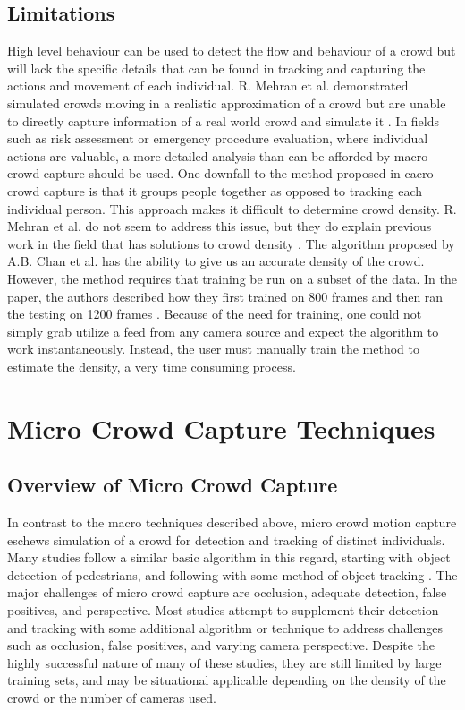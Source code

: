 \documentclass[12pt, twocolumn, conference]{IEEEtran}
\begin{document}
\subsection{Limitations}

High level behaviour can be used to detect the flow and behaviour of a crowd but will lack the specific details that can be found in tracking and capturing the actions and movement of each individual. R. Mehran et al. demonstrated simulated crowds moving in a realistic approximation of a crowd but are unable to directly capture information of a real world crowd and simulate it \cite{R. Mehran}. 
In fields such as risk assessment or emergency procedure evaluation, where individual actions are valuable, a more detailed analysis than can be afforded by macro crowd capture should be used.
One downfall to the method proposed in cacro crowd capture is that it groups people together as opposed to tracking each individual person. This approach makes it difficult to determine crowd density. R. Mehran et al. do not seem to address this issue, but they do explain previous work in the field that has solutions to crowd density \cite{N. Courty}\cite{R. Mehran}\cite{S. Saxena}. 
The algorithm proposed by A.B. Chan et al. has the ability to give us an accurate density of the crowd. However, the method requires that training be run on a subset of the data. In the paper, the authors described how they first trained on 800 frames and then ran the testing on 1200 frames \cite{A.B. Chan}. Because of the need for training, one could not simply grab utilize a feed from any camera source and expect the algorithm to work instantaneously. Instead, the user must manually train the method to estimate the density, a very time consuming process.

\section{Micro Crowd Capture Techniques}

\subsection{Overview of Micro Crowd Capture}

In contrast to the macro techniques described above, micro crowd motion capture eschews simulation of a crowd for detection and tracking of distinct individuals. Many studies follow a similar basic algorithm in this regard, starting with object detection of pedestrians, and following with some method of object tracking \cite{M. Rodriguez}\cite{D. Zhang}\cite{I. Ali}\cite{F. Zhao}\cite{I. Ali2}. The major challenges of micro crowd capture are occlusion, adequate detection, false positives, and perspective. Most studies attempt to supplement their detection and tracking with some additional algorithm or technique to address challenges such as occlusion, false positives, and varying camera perspective. 
Despite the highly successful nature of many of these studies, they are still limited by large training sets, and may be situational applicable depending on the density of the crowd or the number of cameras used.
\end{document}
